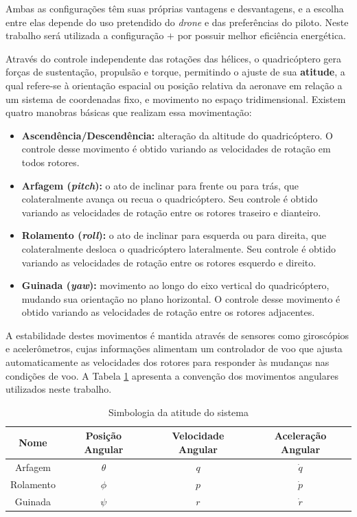 \documentclass[main.tex]{subfiles}
\begin{document}
Ambas as configurações têm suas próprias vantagens e desvantagens, e a escolha entre elas depende do uso pretendido do \textit{drone} e das preferências do piloto. Neste trabalho será utilizada a configuração $+$ por possuir melhor eficiência energética.

Através do controle independente das rotações das hélices, o quadricóptero gera forças de sustentação, propulsão e torque, permitindo o ajuste de sua \textbf{atitude}, a qual refere-se à orientação espacial ou posição relativa da aeronave em relação a um sistema de coordenadas fixo, e movimento no espaço tridimensional. Existem quatro manobras básicas que realizam essa movimentação:

\begin{itemize}
    \item \textbf{Ascendência/Descendência:} alteração da altitude do quadricóptero. O controle desse movimento é obtido variando as velocidades de rotação em todos rotores.
    \item \textbf{Arfagem (\textit{pitch}):} \textcolor{att}{o ato de inclinar para frente ou para trás, que colateralmente avança ou recua o quadricóptero. Seu controle é obtido variando as velocidades de rotação entre os rotores traseiro e dianteiro.}
    \item \textcolor{att}{\textbf{Rolamento (\textit{roll}):} o ato de inclinar para esquerda ou para direita, que colateralmente desloca o quadricóptero lateralmente. Seu controle é obtido variando as velocidades de rotação entre os rotores esquerdo e direito.}
    \item \textcolor{att}{\textbf{Guinada (\textit{yaw}):}} movimento ao longo do eixo vertical do quadricóptero, mudando sua orientação no plano horizontal. O controle desse movimento é obtido variando as velocidades de rotação entre os rotores adjacentes.
\end{itemize}

A estabilidade destes movimentos é mantida através de sensores como giroscópios e acelerômetros, cujas informações alimentam um controlador de voo que ajusta automaticamente as velocidades dos rotores para responder às mudanças nas condições de voo. A Tabela \ref{tab:angulos} apresenta a convenção dos movimentos angulares utilizados neste trabalho.

\begin{table}[!h]
    \centering
    \caption{Simbologia da atitude do sistema}
    \begin{tabular}{|c|c|c|c|}
        \hline
        \textbf{Nome}       & \textbf{Posição Angular}  & \textbf{Velocidade Angular}   & \textbf{Aceleração Angular}  \\\hline
        Arfagem             & $\theta$                  & $q$                           & $\dot{q}$\\\hline
        Rolamento           & $\phi$                    & $p$                           & $\dot{p}$ \\\hline
        Guinada             & $\psi$                    & $r$                           & $\dot{r}$ \\\hline
        \end{tabular}
    \label{tab:angulos}
\end{table}
\end{document}
